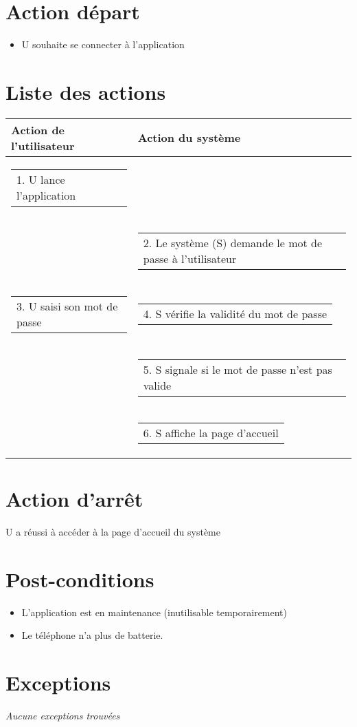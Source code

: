 \documentclass[a4paper, 12pt, french]{article}
\makeatletter
\newcommand{\retourLigne}[2][c]{\begin{tabular}[#1]{@{}l@{}}#2\end{tabular}}
\makeatother
\begin{document}
\section{Action départ}
\begin{itemize}
	\item U souhaite se connecter à l'application
\end{itemize}

\section{Liste des actions}
	\begin{longtable}{|l|l|}
 	\hline
 	\textbf{Action de l'utilisateur} & \textbf{Action du système} \\ \hline
 	\hline
	\retourLigne{1. U lance l'application} &   \\ \hline
	& \retourLigne{2. Le système (S) demande le mot de passe à l'utilisateur} \\ \hline
	\retourLigne{3. U saisi son mot de passe } & \retourLigne{4. S vérifie la validité du mot de passe} \\ \hline
	& \retourLigne{5. S signale si le mot de passe n'est pas valide}  \\ \hline
	& \retourLigne{6. S affiche la page d'accueil} \\
	\hline
	\end{longtable}

\section{Action d'arrêt}

U a réussi à accéder à la page d'accueil du système

\section{Post-conditions}

\begin{itemize}
	\item L'application est en maintenance (inutilisable temporairement) 
	\item Le téléphone n'a plus de batterie.
\end{itemize}

\section{Exceptions}
\textit{Aucune exceptions trouvées}
\end{document}

